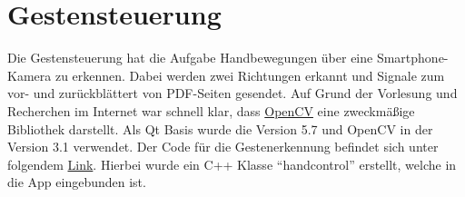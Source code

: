 \chapter{Gestensteuerung}
\thispagestyle{fancy}

Die Gestensteuerung hat die Aufgabe Handbewegungen über eine Smartphone-Kamera zu erkennen. Dabei werden zwei Richtungen erkannt und Signale zum vor- und zurückblättert von PDF-Seiten gesendet. Auf Grund der Vorlesung und Recherchen im Internet war schnell klar, dass \href{http://opencv.org/}{OpenCV} eine zweckmäßige Bibliothek darstellt. Als Qt Basis wurde die Version 5.7 und OpenCV in der Version 3.1 verwendet. Der Code für die Gestenerkennung befindet sich unter folgendem \href{https://github.com/BeckmaR/EmbeddedMultimediaSS2016/tree/master/src/handcontrol}{Link}. Hierbei wurde ein C++ Klasse "`handcontrol"' erstellt, welche in die App eingebunden ist.


